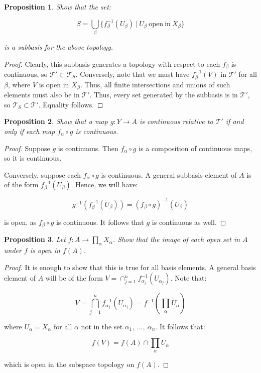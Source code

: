 \documentclass[10pt, oneside]{amsart}
\newtheorem{prop}{Proposition}
\begin{document}
    \begin{prop}
      Show that the set:

      $$S = \displaystyle\bigcup_{\beta} \{ f_{\beta}^{-1}(U_{\beta}) \ | \ U_{\beta} \ \mathrm{open} \ \mathrm{in} \ X_{\beta} \}$$

      is a subbasis for the above topology.
    \end{prop}

    \begin{proof}
      Clearly, this subbasis generates a topology with respect to each $f_{\beta}$ is continuous, so $\mathcal{T}' \subset \mathcal{T}_{S}$. Conversely, note that we must have $f^{-1}_{\beta}(V)$ in $\mathcal{T}'$ for
      all $\beta$, where $V$ is open in $X_{\beta}$. Thus, all finite intersections and unions of such elements must also be in $\mathcal{T}'$. Thus, every set generated by the subbasis is in $\mathcal{T}'$, so $\mathcal{T}_{S} \subset \mathcal{T}'$.
      Equality follows.
    \end{proof}

    \begin{prop}
      Show that a map $g : Y \rightarrow A$ is continuous relative to $\mathcal{T}'$ if and only if each map $f_{\alpha} \circ g$ is continuous.
    \end{prop}

    \begin{proof}
      Suppose $g$ is continuous. Then $f_{\alpha} \circ g$ is a composition of continuous maps, so it is continuous.
      \newline

      Conversely, suppose each $f_{\alpha} \circ g$ is continuous. A general subbasis element of $A$ is of the form $f_{\beta}^{-1}(U_{\beta})$. Hence, we will have:

      $$g^{-1} (f_{\beta}^{-1}(U_{\beta})) = (f_{\beta} \circ g)^{-1}(U_{\beta})$$

      is open, as $f_{\beta} \circ g$ is continuous. It follows that $g$ is continuous as well.
    \end{proof}

    \begin{prop}
      Let $f : A \rightarrow \prod_{\alpha} X_{\alpha}$. Show that the image of each open set in $A$ under $f$ is open in $f(A)$.
    \end{prop}

    \begin{proof}
      It is enough to show that this is true for all basis elements. A general basis element of $A$ will be of the form $V = \cap_{j = 1}^{n} f^{-1}_{\alpha_j}(U_{\alpha_j})$. Note that:

      $$V = \displaystyle\bigcap_{j = 1}^{n} f^{-1}_{\alpha_j}(U_{\alpha_j}) = f^{-1} \left( \displaystyle\prod_{\alpha} U_{\alpha} \right)$$

      where $U_{\alpha} = X_{\alpha}$ for all $\alpha$ not in the set $\alpha_1, \ ..., \ \alpha_n$. It follows that:

      $$f(V) = f(A) \cap  \displaystyle\prod_{\alpha} U_{\alpha}$$

      which is open in the subspace topology on $f(A)$.
    \end{proof}
\end{document}
